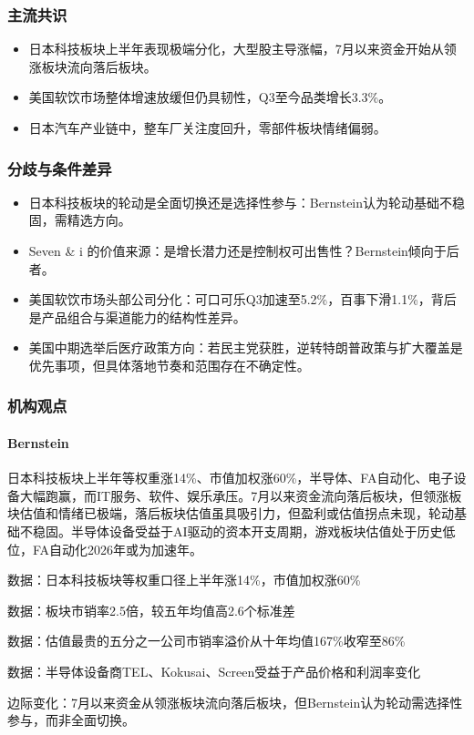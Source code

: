 \documentclass[11pt]{ctexart}
\begin{document}
\subsubsection*{主流共识}
\begin{itemize}
  \item 日本科技板块上半年表现极端分化，大型股主导涨幅，7月以来资金开始从领涨板块流向落后板块。
  \item 美国软饮市场整体增速放缓但仍具韧性，Q3至今品类增长3.3\%。
  \item 日本汽车产业链中，整车厂关注度回升，零部件板块情绪偏弱。
\end{itemize}
\subsubsection*{分歧与条件差异}
\begin{itemize}
  \item 日本科技板块的轮动是全面切换还是选择性参与：Bernstein认为轮动基础不稳固，需精选方向。
  \item Seven \& i 的价值来源：是增长潜力还是控制权可出售性？Bernstein倾向于后者。
  \item 美国软饮市场头部公司分化：可口可乐Q3加速至5.2\%，百事下滑1.1\%，背后是产品组合与渠道能力的结构性差异。
  \item 美国中期选举后医疗政策方向：若民主党获胜，逆转特朗普政策与扩大覆盖是优先事项，但具体落地节奏和范围存在不确定性。
\end{itemize}
\subsubsection*{机构观点}
\paragraph{Bernstein} 日本科技板块上半年等权重涨14\%、市值加权涨60\%，半导体、FA自动化、电子设备大幅跑赢，而IT服务、软件、娱乐承压。7月以来资金流向落后板块，但领涨板块估值和情绪已极端，落后板块估值虽具吸引力，但盈利或估值拐点未现，轮动基础不稳固。半导体设备受益于AI驱动的资本开支周期，游戏板块估值处于历史低位，FA自动化2026年或为加速年。
{\small\color{refgray}数据：日本科技板块等权重口径上半年涨14\%，市值加权涨60\%\par}
{\small\color{refgray}数据：板块市销率2.5倍，较五年均值高2.6个标准差\par}
{\small\color{refgray}数据：估值最贵的五分之一公司市销率溢价从十年均值167\%收窄至86\%\par}
{\small\color{refgray}数据：半导体设备商TEL、Kokusai、Screen受益于产品价格和利润率变化\par}
{\small\color{refgray}边际变化：7月以来资金从领涨板块流向落后板块，但Bernstein认为轮动需选择性参与，而非全面切换。\par}
\end{document}
